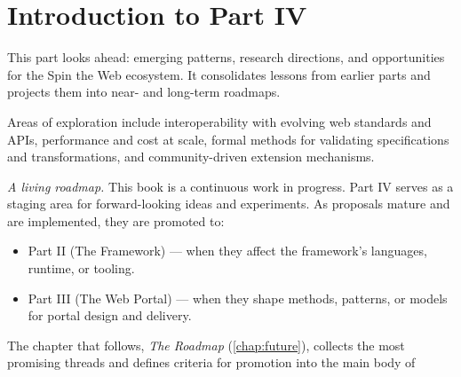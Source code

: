 
\chapter*{Introduction to Part IV}
\label{part:future}

This part looks ahead: emerging patterns, research directions, and opportunities for the Spin the Web ecosystem. It consolidates lessons from earlier parts and projects them into near- and long-term roadmaps.

Areas of exploration include interoperability with evolving web standards and APIs, performance and cost at scale, formal methods for validating specifications and transformations, and community-driven extension mechanisms.

\textit{A living roadmap.} This book is a continuous work in progress. Part IV serves as a staging area for forward-looking ideas and experiments. As proposals mature and are implemented, they are promoted to:
\begin{itemize}
  \item Part II (The Framework) --- when they affect the framework’s languages, runtime, or tooling.
  \item Part III (The Web Portal) --- when they shape methods, patterns, or models for portal design and delivery.
\end{itemize}

\noindent The chapter that follows, \emph{The Roadmap} (\cref{chap:future}), collects the most promising threads and defines criteria for promotion into the main body of

